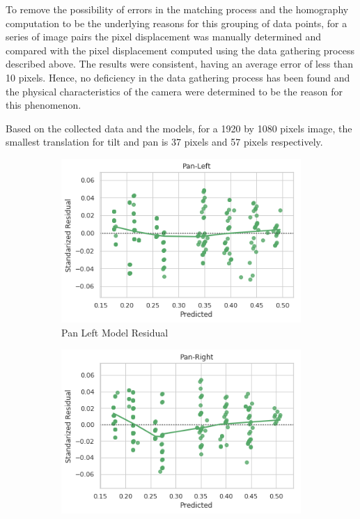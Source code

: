 \documentclass{l4proj}
\begin{document}
To remove the possibility of errors in the matching process and the homography computation to be the underlying reasons for this grouping of data points, for a series of image pairs the pixel displacement was manually determined and compared with the pixel displacement computed using the data gathering process described above. The results were consistent, having an average error of less than 10 pixels. Hence, no deficiency in the data gathering process has been found and the physical characteristics of the camera were determined to be the reason for this phenomenon. 

Based on the collected data and the models, for a 1920 by 1080 pixels image, the smallest translation for tilt and pan is 37 pixels and 57 pixels respectively.

\begin{figure}[H]
  \begin{subfigure}[b]{0.5\textwidth}
    \includegraphics[width=\textwidth]{l4template-master/images/pan_left_residual.png}
    \caption{Pan Left Model Residual}
    \label{panleftmodelres}
  \end{subfigure}
  \begin{subfigure}[b]{0.5\textwidth}
    \includegraphics[width=\textwidth]{l4template-master/images/pan_right_residual.png}

\end{subfigure}
\end{figure}
\end{document}
